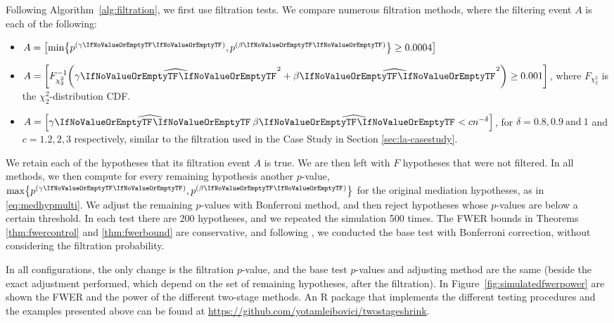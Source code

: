 \documentclass[ejs, twoside]{imsart}
\theoremstyle{plain}
\theoremstyle{remark}
\newcommand{\andtext}{\ \mathrm{and}\ }
\newcommand{\pvalue}{\(p\)-value}
\newcommand{\estim}[1]{\widehat{\regcoef{#1}}}
\numberwithin{equation}{section}
\numberwithin{table}{section}
\numberwithin{figure}{section}
\let\originalleft\left
\let\originalright\right
\renewcommand{\left}{\mathopen{}\mathclose\bgroup\originalleft}
\renewcommand{\right}{\aftergroup\egroup\originalright}
\begin{document}
Following Algorithm~\ref{alg:filtration}, we first use filtration tests. We compare numerous filtration methods, where the filtering event \(A\) is each of the following:%
\begin{itemize}
	\item \(A = \left[\min\left\lbrace \regpval{1}, \regpval{2} \right\rbrace \geq 0.0004\right] \)
	\item \(A = \left[ F_{\chi_2^2}^{-1}\left( \estim{1}^2 + \estim{2}^2\right) \geq 0.001 \right] \), where \(F_{\chi_2^2}\) is the \(\chi_2^2\)-distribution CDF.
	\item \(A = \left[ \product < cn^{-\delta}\right] \), for \(\delta = 0.8, 0.9 \andtext 1\) and \(c = 1.2, 2, 3\) respectively, similar to the filtration used in the Case Study in Section \ref{sec:la-casestudy}.
\end{itemize}
%
We retain each of the hypotheses that its filtration event \(A\) is true. We are then left with \(F\) hypotheses that were not filtered. In all methods, we then compute for every remaining hypothesis another \pvalue{}, \(\max\left\lbrace \regpval{1}, \regpval{2} \right\rbrace\) for the original mediation hypotheses, as in \eqref{eq:medhypmulti}. We adjust the remaining \pvalue{}s with Bonferroni method, and then reject hypotheses whose \pvalue{}s are below a certain threshold. In each test there are 200 hypotheses, and we repeated the simulation 500 times. The FWER bounds in Theorems \ref{thm:fwercontrol} and \ref{thm:fwerbound} are conservative, and following \citet{djordjilovic_optimal_2020}, we conducted the base test with Bonferroni correction, without considering the filtration probability.

In all configurations, the only change is the filtration \pvalue{}, and the base test \pvalue{}s and adjusting method are the same (beside the exact adjustment performed, which depend on the set of remaining hypotheses, after the filtration). In Figure~\ref{fig:simulatedfwerpower} are shown the FWER and the power of the different two-stage methods. An R package that implements the different testing procedures and the examples presented above can be found at \url{https://github.com/yotamleibovici/twostageshrink}.
\end{document}
